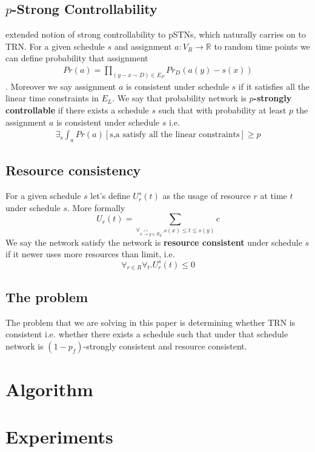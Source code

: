 \documentclass{article}
\begin{document}
\begin{multicols}{2}
\subsection{$p$-Strong Controllability}
\cite{Fang2014} extended notion of strong controllability to pSTNs, which naturally carries on to TRN.  For a given schedule $s$ and assignment $a: V_R \rightarrow \mathbb{R}$ to random time points we can define probability that assignment
\begin{align*}
Pr(a) = \prod_{(y-x \sim D) \in E_P} Pr_D(a(y)-s(x))
\end{align*}.
Moreover we say assignment $a$ is consistent under schedule $s$ if it satisfies all the linear time constraints in $E_L$.
We say that probability network is \textbf{$p$-strongly controllable} if there exists a schedule $s$ such that with probability at least $p$ the assignment $a$ is consistent under schedule $s$ i.e.
\begin{align*}
\exists_s \int_{a} Pr(a) [\text{s,a satisfy all the linear constraints} ] \geq p
\end{align*}

\subsection{Resource consistency}
For a given schedule $s$ let's define $U_r^s(t)$ as the usage of resource $r$ at time $t$ under schedule $s$. More formally
\[
U_r(t) = \sum_{\forall_{x \xrightarrow{r:c} y \in R_E}. s(x)\leq t \leq s(y)} c
\]
We say the network satisfy the network is \textbf{resource consistent} under schedule $s$ if it newer uses more resources than limit, i.e.
\[
\forall_{r \in R} \forall_{t} . U_r^s(t) \leq 0
\]
\subsection{The problem}
The problem that we are solving in this paper is determining whether TRN is consistent i.e. whether
there exists a schedule such that under that schedule network is $(1-p_f)$-strongly consistent and resource consistent.


\section{Algorithm}
\blindtext[5]
\section{Experiments}
\blindtext[5]

\end{multicols}
\end{document}
